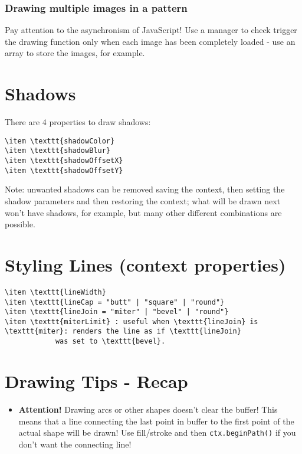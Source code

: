 \documentclass[a4paper,11pt]{book}
\begin{document}
\subsubsection{Drawing multiple images in a pattern}
Pay attention to the asynchronism of JavaScript! Use a manager to check trigger the drawing function only when each
image has been completely loaded - use an array to store the images, for example.

\section{Shadows}
There are 4 properties to draw shadows:
\begin{verbatim}
\item \texttt{shadowColor}
\item \texttt{shadowBlur}
\item \texttt{shadowOffsetX}
\item \texttt{shadowOffsetY}
\end{verbatim}
Note: unwanted shadows can be removed saving the context, then setting the shadow parameters and then restoring the context;
what will be drawn next won't have shadows, for example, but many other different combinations are possible.

\section{Styling Lines (context properties)}
\begin{verbatim}
\item \texttt{lineWidth}
\item \texttt{lineCap = "butt" | "square" | "round"}
\item \texttt{lineJoin = "miter" | "bevel" | "round"}
\item \texttt{miterLimit} : useful when \texttt{lineJoin} is \texttt{miter}: renders the line as if \texttt{lineJoin}
			was set to \texttt{bevel}.
\end{verbatim}

\section{Drawing Tips - Recap}
\begin{itemize}
\item \textbf{Attention!} Drawing arcs or other shapes
	  doesn't clear the buffer! This means that a line connecting the last point in buffer to the first point
	  of the actual shape will be drawn! Use fill/stroke and then \texttt{ctx.beginPath()} if you don't want the connecting
	  line!
\end{itemize}
\end{document}
